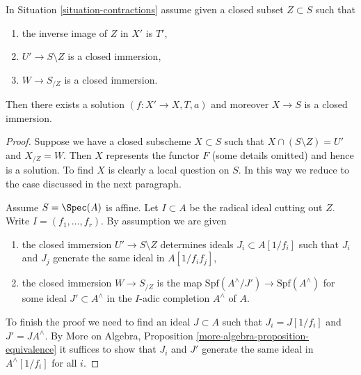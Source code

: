 \begin{lemma}
\label{lemma-closed-immersion}
In Situation \ref{situation-contractions} assume given a closed
subset $Z \subset S$ such that
\begin{enumerate}
\item the inverse image of $Z$ in $X'$ is $T'$,
\item $U' \to S \setminus Z$ is a closed immersion,
\item $W \to S_{/Z}$ is a closed immersion.
\end{enumerate}
Then there exists a solution $(f : X' \to X, T, a)$
and moreover $X \to S$ is a closed immersion.
\end{lemma}

\begin{proof}
Suppose we have a closed subscheme $X \subset S$ such that
$X \cap (S \setminus Z) = U'$ and $X_{/Z} = W$. Then
$X$ represents the functor $F$ (some details omitted) and hence 
is a solution. To find $X$ is clearly a local question on $S$.
In this way we reduce to the case discussed in the next paragraph.

\medskip\noindent
Assume $S = \Spec(A)$ is affine. Let $I \subset A$ be the
radical ideal cutting out $Z$.
Write $I = (f_1, \ldots, f_r)$. By assumption we are given
\begin{enumerate}
\item the closed immersion $U' \to S \setminus Z$ determines
ideals $J_i \subset A[1/f_i]$ such that $J_i$ and $J_j$
generate the same ideal in $A[1/f_if_j]$,
\item the closed immersion $W \to S_{/Z}$ is the map
$\text{Spf}(A^\wedge/J') \to \text{Spf}(A^\wedge)$ for some
ideal $J' \subset A^\wedge$ in the $I$-adic completion $A^\wedge$ of $A$.
\end{enumerate}
To finish the proof we need to find an ideal $J \subset A$
such that $J_i = J[1/f_i]$ and $J' = JA^\wedge$. By
More on Algebra, Proposition \ref{more-algebra-proposition-equivalence}
it suffices to show that $J_i$ and $J'$ generate the same ideal
in $A^\wedge[1/f_i]$ for all $i$.


\end{proof}
